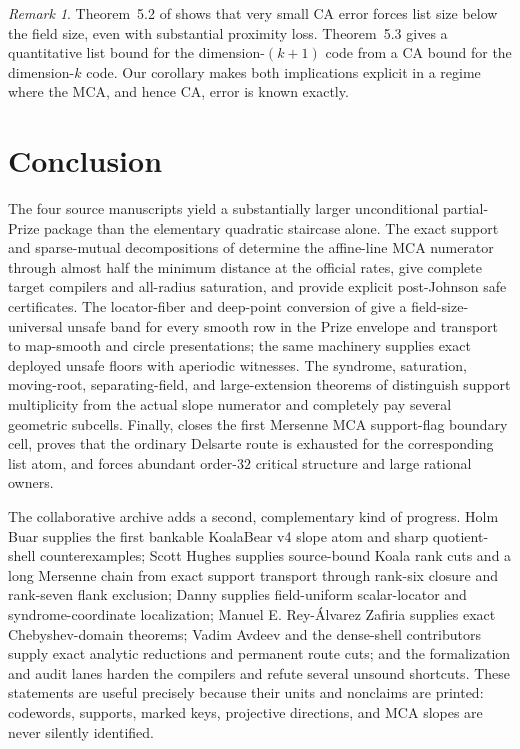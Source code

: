 \documentclass[11pt,a4paper]{amsart}
\numberwithin{equation}{section}
\theoremstyle{remark}
\newtheorem{remark}[theorem]{Remark}
\begin{document}
\begin{remark}
Theorem~5.2 of \cite{ABF26} shows that very small CA error forces list size below the field size, even with substantial proximity loss.  Theorem~5.3 gives a quantitative list bound for the dimension-$(k+1)$ code from a CA bound for the dimension-$k$ code.  Our corollary makes both implications explicit in a regime where the MCA, and hence CA, error is known exactly.
\end{remark}

\section{Conclusion}

The four source manuscripts yield a substantially larger unconditional partial-Prize package than the elementary quadratic staircase alone.  The exact support and sparse-mutual decompositions of \cite{ChoShort26} determine the affine-line MCA numerator through almost half the minimum distance at the official rates, give complete target compilers and all-radius saturation, and provide explicit post-Johnson safe certificates.  The locator-fiber and deep-point conversion of \cite{ChoCap26} give a field-size-universal unsafe band for every smooth row in the Prize envelope and transport to map-smooth and circle presentations; the same machinery supplies exact deployed unsafe floors with aperiodic witnesses.  The syndrome, saturation, moving-root, separating-field, and large-extension theorems of \cite{ChoGF26} distinguish support multiplicity from the actual slope numerator and completely pay several geometric subcells.  Finally, \cite{ChoComp26} closes the first Mersenne MCA support-flag boundary cell, proves that the ordinary Delsarte route is exhausted for the corresponding list atom, and forces abundant order-$32$ critical structure and large rational owners.

The collaborative archive adds a second, complementary kind of progress.  Holm Buar supplies the first bankable KoalaBear v4 slope atom and sharp quotient-shell counterexamples; Scott Hughes supplies source-bound Koala rank cuts and a long Mersenne chain from exact support transport through rank-six closure and rank-seven flank exclusion; Danny supplies field-uniform scalar-locator and syndrome-coordinate localization; Manuel E. Rey-\'Alvarez Zafiria supplies exact Chebyshev-domain theorems; Vadim Avdeev and the dense-shell contributors supply exact analytic reductions and permanent route cuts; and the formalization and audit lanes harden the compilers and refute several unsound shortcuts.  These statements are useful precisely because their units and nonclaims are printed: codewords, supports, marked keys, projective directions, and MCA slopes are never silently identified.
\end{document}
